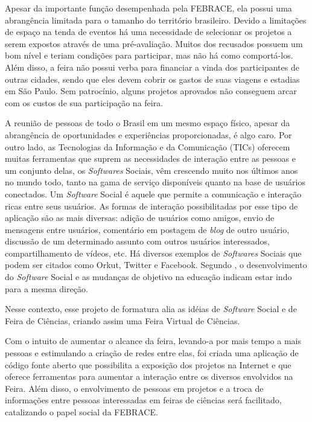 Apesar da importante função desempenhada pela FEBRACE, ela possui uma abrangência limitada para o tamanho do território brasileiro. Devido a limitações de espaço na tenda de eventos há uma necessidade de selecionar os projetos a serem expostos através de uma pré-avaliação. Muitos dos recusados possuem um bom nível e teriam condições para participar, mas não há como comportá-los. Além disso, a feira não possui verba para financiar a vinda dos participantes de outras cidades, sendo que eles devem cobrir os gastos de suas viagens e estadias em São Paulo. Sem patrocínio, alguns projetos aprovados não conseguem arcar com os custos de sua participação na feira.

A reunião de pessoas de todo o Brasil em um mesmo espaço físico, apesar da abrangência de oportunidades e experiências proporcionadas, é algo caro. Por outro lado, as Tecnologias da Informação e da Comunicação (TICs) oferecem muitas ferramentas que suprem as necessidades de interação entre as pessoas e um conjunto delas, os \textit{Softwares} Sociais, vêm crescendo muito nos últimos anos no mundo todo, tanto na gama de serviço disponíveis quanto na base de usuários conectados. Um \textit{Software} Social é aquele que permite a comunicação e interação ricas entre seus usuários. As formas de interação possibilitadas por esse tipo de aplicação são as mais diversas: adição de usuários como amigos, envio de mensagens entre usuários, comentário em postagem de \textit{blog} de outro usuário, discussão de um determinado assunto com outros usuários interessados, compartilhamento de vídeos, etc. Há diversos exemplos de \textit{Softwares} Sociais que podem ser citados como Orkut, Twitter e Facebook. Segundo , o desenvolvimento do \textit{Software} Social e as mudanças de objetivo na educação indicam estar indo para a mesma direção.

Nesse contexto, esse projeto de formatura alia as idéias de \textit{Software} Social e de Feira de Ciências, criando assim uma Feira Virtual de Ciências. 

Com o intuito de aumentar o alcance da feira, levando-a por mais tempo a mais pessoas e estimulando a criação de redes entre elas, foi criada uma aplicação de código fonte aberto que possibilita a exposição dos projetos na Internet e que oferece ferramentas para aumentar a interação entre os diversos envolvidos na Feira. Além disso, o envolvimento de pessoas em projetos e a troca de informações entre pessoas interessadas em feiras de ciências será facilitado, catalizando o papel social da FEBRACE.

